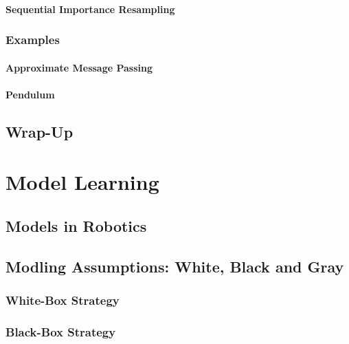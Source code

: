 			\subsubsection{Sequential Importance Resampling} %

		\subsection{Examples} %

			\subsubsection{Approximate Message Passing} %

			\subsubsection{Pendulum} %

	\section{Wrap-Up} %

\chapter{Model Learning} %

	\section{Models in Robotics} %

	\section{Modling Assumptions: White, Black and Gray} %

		\subsection{White-Box Strategy} %

		\subsection{Black-Box Strategy} %

